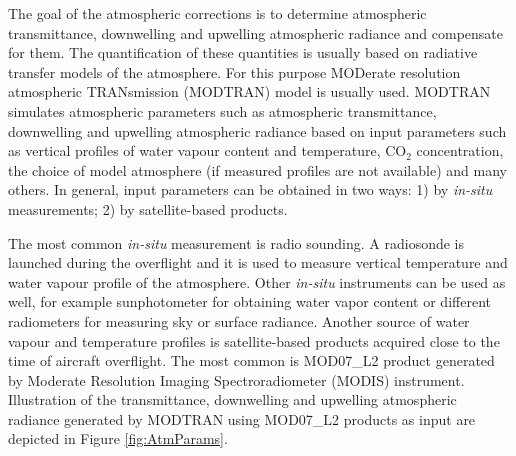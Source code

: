 The goal of the atmospheric corrections is to determine atmospheric transmittance, downwelling and upwelling atmospheric radiance and compensate for them. The quantification of these quantities is usually based on radiative transfer models of the atmosphere. For this purpose MODerate resolution atmospheric TRANsmission (MODTRAN) model \cite{BG06} is usually used. MODTRAN simulates atmospheric parameters such as atmospheric transmittance, downwelling and upwelling atmospheric radiance based on input parameters such as vertical profiles of water vapour content and temperature, CO$_2$ concentration, the choice of model atmosphere (if measured profiles are not available) and many others. In general, input parameters can be obtained in two ways: 1) by \textit{in-situ} measurements; 2) by satellite-based products.

The most common \textit{in-situ} measurement is radio sounding. A radiosonde is launched during the overflight and it is used to measure vertical temperature and water vapour profile of the atmosphere. Other \textit{in-situ} instruments can be used as well, for example sunphotometer for obtaining water vapor content or different radiometers for measuring sky or surface radiance. Another source of water vapour and temperature profiles is satellite-based products acquired close to the time of aircraft overflight. The most common is MOD07\_L2 product \cite{B11} generated by Moderate Resolution Imaging Spectroradiometer (MODIS) instrument. Illustration of the transmittance, downwelling and upwelling atmospheric radiance generated by MODTRAN using MOD07\_L2 products as input are depicted in Figure \ref{fig:AtmParams}.

